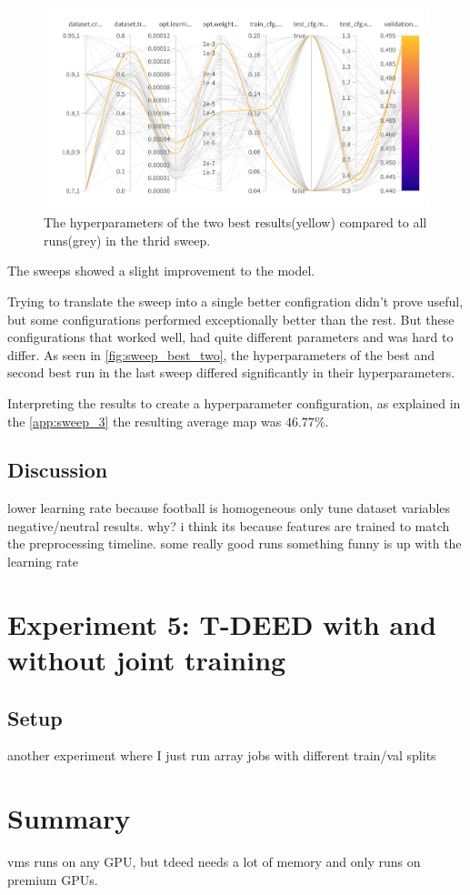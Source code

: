 \begin{figure}
    \centering
    \includegraphics[width=1\linewidth]{figures/sweep_two_best.png}
    \caption{The hyperparameters of the two best results(yellow) compared to all runs(grey) in the thrid sweep. }
    \label{fig:sweep_best_two}
\end{figure}

The sweeps showed a slight improvement to the model. 

Trying to translate the sweep into a single better configration didn't prove useful, but some configurations performed exceptionally better than the rest. But these configurations that worked well, had quite different parameters and was hard to differ. As seen in \autoref{fig:sweep_best_two}, the hyperparameters of the best and second best run in the last sweep differed significantly in their hyperparameters. 

Interpreting the results to create a hyperparameter configuration, as explained in the \autoref{app:sweep_3} the resulting average \acrshort{map} was \(46.77\%\). 

\subsection{Discussion}
\label{ssec:ex4_discussion}
lower learning rate because football is homogeneous
only tune dataset variables
negative/neutral results. why? i think its because features are trained to match the preprocessing timeline. some really good runs
something funny is up with the learning rate



\section{Experiment 5: T-DEED with and without joint training}
\subsection{Setup}
\label{ssec:ex5_setup}

another experiment where I just run array jobs with different train/val splits

\section{Summary}
vms runs on any GPU, but tdeed needs a lot of memory and only runs on premium GPUs.